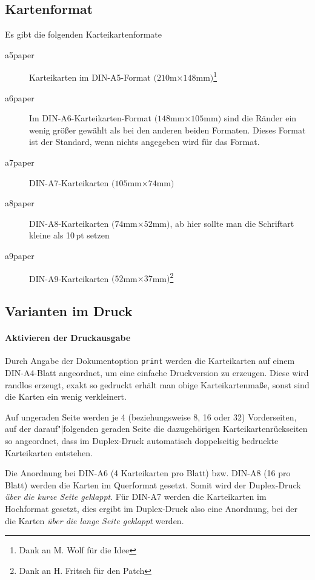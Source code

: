 \documentclass[a4paper,DIV=calc]{scrartcl}
\newcommand{\befehl}[1]{%
\marginpar{\footnotesize\textsf{#1}}%
}
\begin{document}
\subsection{Kartenformat}
\befehl{aXpaper}
Es gibt die folgenden Karteikartenformate
\begin{description}
	\item[a5paper] Karteikarten im DIN-A5-Format $(210$m$\times 148$mm$)$\footnote{Dank an M. Wolf für die Idee}
	\item[a6paper] Im DIN-A6-Karteikarten-Format $(148$mm$\times 105$mm$)$ sind die Ränder ein wenig größer gewählt als bei den anderen beiden Formaten. Dieses Format ist der Standard, wenn nichts angegeben wird für das Format.
	\item[a7paper] DIN-A7-Karteikarten $(105$mm$\times 74$mm$)$
	\item[a8paper] DIN-A8-Karteikarten $(74$mm$\times 52$mm$)$, ab hier sollte man die Schriftart kleine als 10\,pt setzen
	\item[a9paper] DIN-A9-Karteikarten $(52$mm$\times 37$mm$)$\footnote{Dank an H. Fritsch für den Patch}
\end{description}
\subsection{Varianten im Druck}\befehl{print}
\paragraph{Aktivieren der Druckausgabe}
Durch Angabe der Dokumentoption \lstinline!print! werden die Karteikarten auf einem DIN-A4-Blatt angeordnet, um eine einfache Druckversion zu erzeugen. Diese wird randlos erzeugt, exakt so gedruckt erhält man obige Karteikartenmaße, sonst sind die Karten ein wenig verkleinert.

Auf ungeraden Seite werden je 4 (beziehungsweise 8, 16 oder 32) Vorderseiten, auf der darauf"|folgenden geraden Seite die dazugehörigen Karteikartenrückseiten so angeordnet, dass im Duplex-Druck automatisch doppelseitig bedruckte Karteikarten entstehen.

Die Anordnung bei DIN-A6 (4 Karteikarten pro Blatt) bzw. DIN-A8 (16 pro Blatt) werden die Karten im Querformat gesetzt. Somit wird der Duplex-Druck  \emph{über die kurze Seite geklappt}. Für DIN-A7 werden die Karteikarten im Hochformat gesetzt, dies ergibt im Duplex-Druck also eine Anordnung, bei der die Karten \emph{über die lange Seite geklappt} werden.
\end{document}
